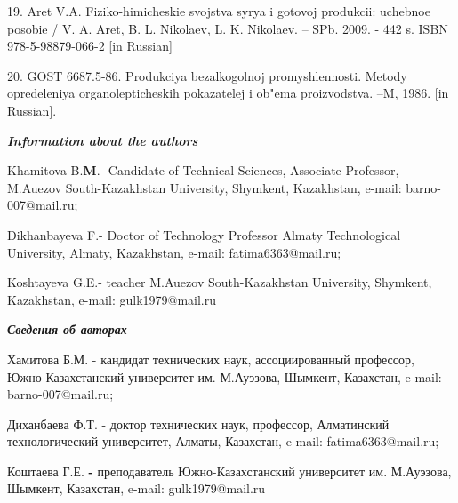 19. Aret V.A. Fiziko-himicheskie svojstva syr\textquotesingle ya i
gotovoj produkcii: uchebnoe posobie / V. A. Aret, B. L. Nikolaev, L. K.
Nikolaev. -- SPb. 2009. - 442 s. ISBN 978-5-98879-066-2 {[}in Russian{]}

20. GOST 6687.5-86. Produkciya bezalkogol\textquotesingle noj
promyshlennosti. Metody opredeleniya organolepticheskih pokazatelej i
ob"ema proizvodstva. --M, 1986. {[}in Russian{]}.

\emph{{\bfseries Information about the authors}}

Khamitova B.{\bfseries M}. -Candidate of Technical Sciences, Associate
Professor, M.Auezov South-Kazakhstan University, Shymkent, Kazakhstan,
e-mail: barno-007@mail.ru;

Dikhanbayeva F.- Doctor of Technology Professor Almaty Technological
University, Almaty, Kazakhstan, e-mail: fatima6363@mail.ru;

Koshtayeva G.E.- teacher M.Auezov South-Kazakhstan University, Shymkent,
Kazakhstan, e-mail: gulk1979@mail.ru

\emph{{\bfseries Сведения об авторах}}

Хамитова Б.М. - кандидат технических наук, ассоциированный профессор,
Южно-Казахстанский университет им. М.Ауэзова, Шымкент, Казахстан,
e-mail: barno-007@mail.ru;

Диханбаева Ф.Т. - доктор технических наук, профессор, Алматинский
технологический университет, Алматы, Казахстан, e-mail:
fatima6363@mail.ru;

Коштаева Г.Е. {\bfseries -} преподаватель Южно-Казахстанский университет
им. М.Ауэзова, Шымкент, Казахстан, e-mail: gulk1979@mail.ru